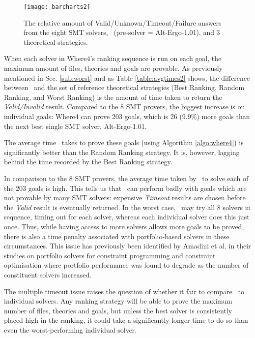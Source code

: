 \begin{figure}
	\centering
	\texttt{[image: barcharts2]}
	\caption[The relative amount of Valid/Unknown/Timeout/Failure answers from the eight SMT solvers, \where, and 3 theoretical strategies.]{The relative amount of Valid/Unknown/Timeout/Failure answers from the eight SMT solvers, \where~(pre-solver = Alt-Ergo-1.01), and 3 theoretical strategies.}
	\label{fig:barchart2}
\end{figure}


When each solver in \textsf{Where4}'s ranking sequence is run on each goal, the maximum amount of files, theories and goals are provable. 
As previously mentioned in Sec. \ref{sub:worst} and as Table \ref{table:avgtimes2} shows, the difference between \where~and the set of reference theoretical strategies (\textsf{Best Ranking}, \textsf{Random Ranking}, and \textsf{Worst Ranking}) is the amount of time taken to return the \textit{Valid/Invalid} result. 
Compared to the 8 SMT provers, the biggest increase is on individual goals: \textsf{Where4} can prove 203 goals, which is 26 (9.9\%) more goals than the next best single SMT solver, Alt-Ergo-1.01.

The average time \where~takes to prove these goals 
(using Algorithm \ref{algo:where4}) 
is significantly better than the \textsf{Random Ranking} strategy.
It is, however, lagging behind the time recorded by the \textsf{Best Ranking} strategy. 

In comparison to the 8 SMT provers, the average time taken by \where~to solve each of the 203 goals is high. 
This tells us that \where~can perform badly with goals which are not provable by many SMT solvers: expensive \textit{Timeout} results are chosen before the \textit{Valid} result is eventually returned. 
In the worst case, \where~may try all 8 solvers in sequence, timing out for each solver, whereas each individual solver does this just once. 
Thus, while having access to more solvers allows more goals to be proved, there is also a time penalty associated with portfolio-based solvers in these circumstances.
This issue has previously been identified by Amadini et al. in their studies on portfolio solvers for constraint programming \cite{Amadini2013} and constraint optimisation \cite{Amadini2016} where portfolio performance was found to degrade as the number of constituent solvers increased.

The multiple timeout issue raises the question of whether it fair to compare \where~to individual solvers. 
Any ranking strategy will be able to prove the maximum number of files, theories and goals, but unless the best solver is consistently placed high in the ranking, it could take a significantly longer time to do so than even the worst-performing individual solver.   

